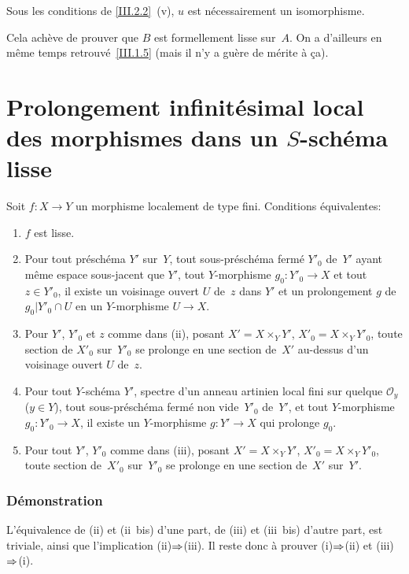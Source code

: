 \begin{corollaire}
\label{III.2.3}
Sous
les conditions de \ref{III.2.2}~\textup{(v)}, $u$ est n\'ecessairement
un isomorphisme.
\end{corollaire}

Cela ach\`eve de prouver que $B$ est formellement lisse sur~$A$. On
a d'ailleurs en m\^eme temps retrouv\'e~\ref{III.1.5} (mais il n'y
a gu\`ere de m\'erite \`a \c ca).

\section[Prolongement infinit\'esimal local des morphismes]{Prolongement infinit\'esimal local des morphismes dans un
$S$-sch\'ema lisse}
\label{III.3}

\begin{theoreme}
\label{III.3.1}
Soit $f \colon X \to Y$ un morphisme localement de type fini.
Conditions \'equivalentes:
\begin{enumerate}
\item[(i)] $f$ est lisse.
\item[(ii)] Pour tout pr\'esch\'ema $Y'$ sur~$Y$, tout
sous-pr\'esch\'ema ferm\'e $Y'_0$ de~$Y'$ ayant m\^eme espace
sous-jacent que $Y'$, tout $Y$-morphisme $g_0 \colon Y'_0 \to X$ et
tout $z \in Y'_0$, il existe un voisinage ouvert $U$ de~$z$ dans $Y'$
et un prolongement $g$ de~$g_0|Y'_0 \cap U$ en un $Y$-morphisme $U \to
X$.
\item[(ii~bis)] Pour $Y'$, $Y'_0$ et $z$ comme dans \textup{(ii)}, posant
$X' = X \times_Y Y'$, $X'_0 = X \times_Y Y'_0$, toute section de
$X'_0$ sur~$Y'_0$ se prolonge en une section de~$X'$ au-dessus d'un
voisinage ouvert $U$ de~$z$.
\item[(iii)] Pour tout $Y$-sch\'ema $Y'$, spectre d'un anneau artinien
local fini sur quelque $\mathcal{O}_y$ ($y \in Y$), tout
sous-pr\'esch\'ema ferm\'e non vide~$Y'_0$ de~$Y'$, et tout
$Y$-morphisme $g_0 \colon Y'_0 \to X$, il existe un $Y$-morphisme $g
\colon Y' \to X$ qui prolonge $g_0$.
\item[(iii~bis)] Pour tout $Y'$, $Y'_0$ comme dans \textup{(iii)},
posant $X' = X \times_Y Y'$, $X'_0 = X \times_Y Y'_0$, toute section
de~$X'_0$ sur~$Y'_0$ se prolonge en une section de~$X'$ sur~$Y'$.
\end{enumerate}
\end{theoreme}

\subsubsection*{D\'emonstration} L'\'equivalence de (ii) et (ii~bis) d'une part, de
(iii) et (iii~bis) d'autre part, est triviale, ainsi que l'implication
(ii)$\To$(iii). Il reste donc \`a prouver (i)$\To$(ii) et (iii)$\To$(i).

